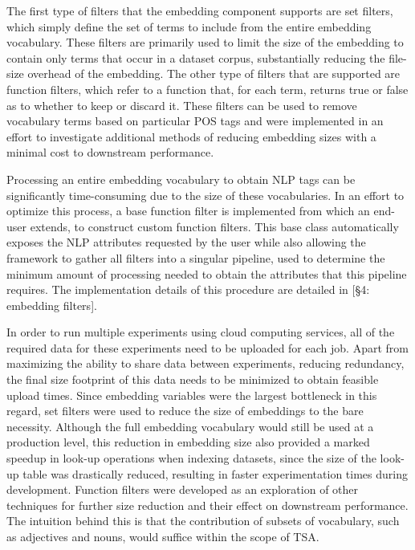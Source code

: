 \documentclass[12pt, a4paper]{report}
\theoremstyle{definition}
\theoremstyle{definition}%
\theoremstyle{definition}%
\theoremstyle{definition}%
\theoremstyle{definition}%
\theoremstyle{definition}%
\begin{document}
The first type of filters that the embedding component supports are set filters, which simply define the set of terms to include from the entire embedding vocabulary. These filters are primarily used to limit the size of the embedding to contain only terms that occur in a dataset corpus, substantially reducing the file-size overhead of the embedding. The other type of filters that are supported are function filters, which refer to a function that, for each term, returns true or false as to whether to keep or discard it. These filters can be used to remove vocabulary terms based on particular POS tags and were implemented in an effort to investigate additional methods of reducing embedding sizes with a minimal cost to downstream performance. 

Processing an entire embedding vocabulary to obtain NLP tags can be significantly time-consuming due to the size of these vocabularies. In an effort to optimize this process, a base function filter is implemented from which an end-user extends, to construct custom function filters. This base class automatically exposes the NLP attributes requested by the user while also allowing the framework to gather all filters into a singular pipeline, used to determine the minimum amount of processing needed to obtain the attributes that this pipeline requires. The implementation details of this procedure are detailed in [\S4: embedding filters].

In order to run multiple experiments using cloud computing services, all of the required data for these experiments need to be uploaded for each job. Apart from maximizing the ability to share data between experiments, reducing redundancy, the final size footprint of this data needs to be minimized to obtain feasible upload times. Since embedding variables were the largest bottleneck in this regard, set filters were used to reduce the size of embeddings to the bare necessity. Although the full embedding vocabulary would still be used at a production level, this reduction in embedding size also provided a marked speedup in look-up operations when indexing datasets, since the size of the look-up table was drastically reduced, resulting in faster experimentation times during development. Function filters were developed as an exploration of other techniques for further size reduction and their effect on downstream performance. The intuition behind this is that the contribution of subsets of vocabulary, such as adjectives and nouns, would suffice within the scope of TSA.
\end{document}
